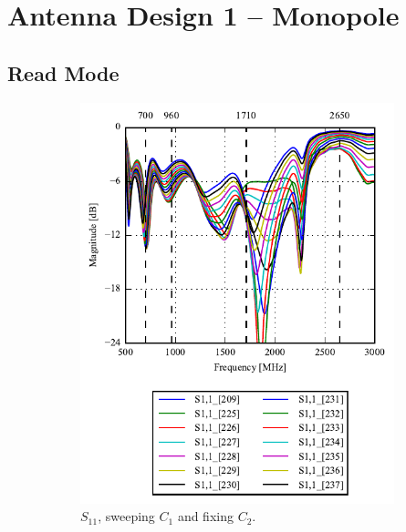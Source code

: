 \section{Antenna Design 1 -- Monopole}

\subsection{Read Mode}
\begin{figure}[htbp]
   \begin{subfigure}[b]{0.49\linewidth}
        \centering
        \includegraphics{img/tech_sol/monopole/read_mode/s11}
        \caption{$S_{11}$, sweeping $C_1$ and fixing $C_2$.}
        \label{fig:ant1_s11}
    \end{subfigure}
    \hfill
    \begin{subfigure}[b]{0.49\linewidth}
        \centering

\end{subfigure}
\end{figure}
